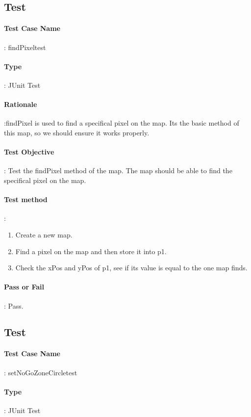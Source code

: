 \documentclass[12pt, a4paper]{report}
\begin{document}
\addtocounter{casecounter}{1}
\subsection{Test }
\paragraph{Test Case Name}: findPixeltest
\paragraph{Type}: JUnit Test
\paragraph{Rationale}:findPixel is used to find a specifical pixel on the map. Its the basic method of this map, so we should ensure it works properly.
\paragraph{Test Objective}: Test the findPixel method of the map. The map should be able to find the specifical pixel on the map.
\paragraph{Test method}: 
\begin{enumerate}
	\item Create a new map.
	\item Find a pixel on the map and then store it into p1. 
	\item Check the xPos and yPos of p1, see if its value is equal to the one map finds.
\end{enumerate}
\paragraph{Pass or Fail}: Pass.

\addtocounter{casecounter}{1}
\subsection{Test }
\paragraph{Test Case Name}: setNoGoZoneCircletest
\paragraph{Type}: JUnit Test
\end{document}

